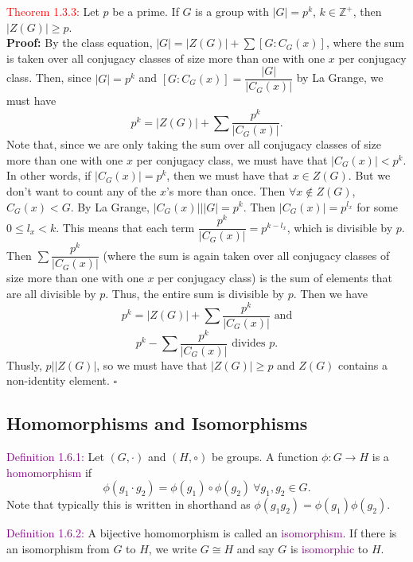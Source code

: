\documentclass{article}
\begin{document}
\textcolor{red}{Theorem 1.3.3:} Let $p$ be a prime. If $G$ is a group with $|G| = p^k$, $k \in \mathbb{Z}^+$, then $|Z(G)| \geq p$.\\
\textbf{Proof:} By the class equation, $|G| = |Z(G)| + \sum{[G:C_G(x)]}$, where the sum is taken over all conjugacy classes of size more 
than one with one $x$ per conjugacy class. Then, since $|G|= p^k$ and $[G:C_G(x)] = \dfrac{|G|}{|C_G(x)|}$ by La Grange, we must have
\[
    p^k = |Z(G)|+\sum{\dfrac{p^k}{|C_G(x)|}}.
\]
Note that, since we are only taking the sum over all conjugacy classes of size more than one with one $x$ per conjugacy class, we must 
have that $|C_G(x)| <p^k$. In other words, if $|C_G(x)| = p^k$, then we must have that $x \in Z(G)$. But we don't want to count any of the 
$x$'s more than once.
Then $\forall x \notin Z(G)$, $C_G(x) < G$. By La Grange, $|C_G(x)| \big| |G| = p^k$. Then $|C_G(x)| = p^{l_x}$ for some $0 \leq l_x < k$. 
This means that each term $\dfrac{p^k}{|C_G(x)|} = p^{k-l_x}$, which is divisible by $p$.
Then $\sum{\dfrac{p^k}{|C_G(x)|}}$ (where the sum is again taken over all conjugacy classes of size more than one with one $x$ per 
conjugacy class) is the sum of elements that are all divisible by $p$. Thus, the entire sum is divisible by $p$. Then we have
\[
    p^k = |Z(G)|+\sum{\dfrac{p^k}{|C_G(x)|}} \text{ and} 
\]
\[
    p^k-\sum{\dfrac{p^k}{|C_G(x)|}} \text{ divides } p.
\]
Thusly, $p \big| |Z(G)|$, so we must have that $|Z(G)| \geq p$ and $Z(G)$ contains a non-identity element. $\square$

\setcounter{subsection}{5}
\subsection{Homomorphisms and Isomorphisms}
\textcolor{purple}{Definition 1.6.1:} Let $(G, \cdot)$ and $(H, \circ)$ be groups. A function $\phi:G \longrightarrow H$ is a 
\textcolor{purple}{homomorphism} if
\[
    \phi(g_1 \cdot g_2) = \phi(g_1) \circ \phi(g_2) \ \forall g_1, g_2 \in G.
\]
Note that typically this is written in shorthand as $\phi(g_1g_2) = \phi(g_1)\phi(g_2)$. 

\textcolor{purple}{Definition 1.6.2:} A bijective homomorphism is called an \textcolor{purple}{isomorphism}. If there is an isomorphism 
from $G$ to $H$, we write $G \cong H$ and say $G$ is \textcolor{purple}{isomorphic} to $H$.
\end{document}
